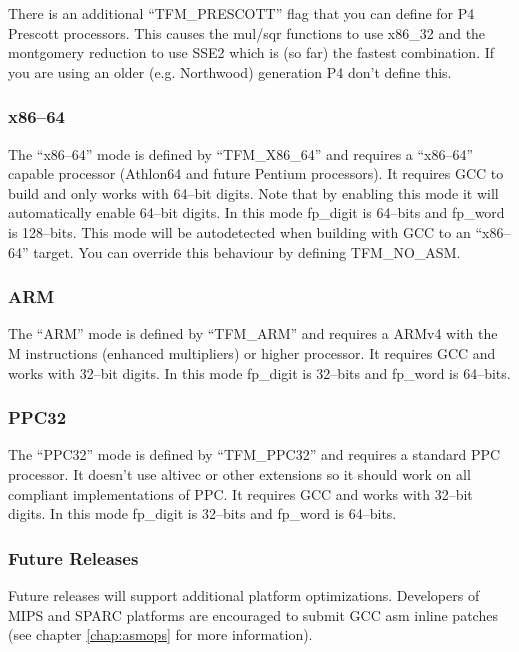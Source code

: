 \documentclass[b5paper]{book}
\begin{document}
There is an additional ``TFM\_PRESCOTT'' flag that you can define for P4 Prescott processors.  This causes
the mul/sqr functions to use x86\_32 and the montgomery reduction to use SSE2 which is (so far) the fastest
combination.  If you are using an older (e.g. Northwood) generation P4 don't define this.

\subsubsection{x86--64}  The ``x86--64'' mode is defined by ``TFM\_X86\_64'' and requires a 
``x86--64'' capable processor (Athlon64 and future Pentium processors).  It requires GCC to
build and only works with 64--bit digits.  Note that by enabling this mode it will automatically
enable 64--bit digits.  In this mode fp\_digit is 64--bits and fp\_word is 128--bits.  This mode will
be autodetected when building with GCC to an ``x86--64'' target.  You can override this behaviour by defining
TFM\_NO\_ASM.

\subsubsection{ARM}  The ``ARM'' mode is defined by ``TFM\_ARM'' and requires a ARMv4 with the M instructions (enhanced 
multipliers) or higher processor.  It requires GCC and works with 32--bit digits.  In this mode fp\_digit is 32--bits and 
fp\_word is 64--bits.

\subsubsection{PPC32} The ``PPC32'' mode is defined by ``TFM\_PPC32'' and requires a standard PPC processor.  It doesn't 
use altivec or other extensions so it should work on all compliant implementations of PPC.  It requires GCC and works
with 32--bit digits.  In this mode fp\_digit is 32--bits and fp\_word is 64--bits.

\subsubsection{Future Releases}  Future releases will support additional platform optimizations.
Developers of MIPS and SPARC platforms are encouraged to submit GCC asm inline patches 
(see chapter \ref{chap:asmops} for more information).
\end{document}

